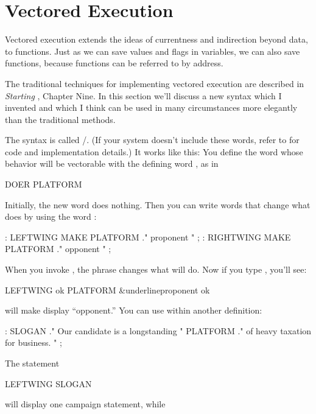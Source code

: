 \section{Vectored Execution}%

Vectored execution extends the ideas of currentness and indirection
beyond data, to functions. Just as we can save values and flags in
variables, we can also save functions, because functions can be referred to
by address.

The traditional techniques for implementing vectored execution are
described in \emph{Starting \Forth{}}, Chapter Nine. In this section we'll
discuss a new syntax which I invented and which I think can be used in many
circumstances more elegantly than the traditional methods.

%
The syntax is called /. (If your system doesn't include
these words, refer to  for code and implementation details.) It
works like this: You define the word whose behavior will be vectorable
with the defining word , as in

\begin{Code}
DOER PLATFORM
\end{Code}
Initially, the new word  does nothing. Then you can write
words that change what  does by using the word :

\begin{Code}
: LEFTWING   MAKE PLATFORM  ." proponent " ;
: RIGHTWING  MAKE PLATFORM  ." opponent " ;
\end{Code}
When you invoke , the phrase  changes
what  will do. Now if you type , you'll see:

\begin{Code}[commandchars=\&\{\}]
LEFTWING ok
PLATFORM &underline{proponent ok}
\end{Code}
 will make  display ``opponent.'' You can use
 within another definition:

\begin{Code}
: SLOGAN   ." Our candidate is a longstanding " PLATFORM
   ." of heavy taxation for business. " ;
\end{Code}
The statement

\begin{Code}
LEFTWING SLOGAN
\end{Code}
will display one campaign statement, while

